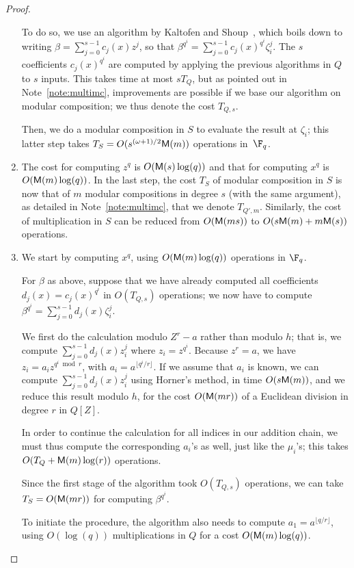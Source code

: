 \begin{proof}
\begin{enumerate}[label=\textbf{Case~\theenumi.},leftmargin=*, align=left]
  To do so, we use an algorithm by Kaltofen and Shoup~\cite{kaltofen+shoup97},
  which boils down to writing $\beta=\sum_{j=0}^{s-1} c_j(x) z^j$, so
  that $\beta^{q^i} = \sum_{j=0}^{s-1} c_j(x)^{q^i} \zeta_i^j.$ The
  $s$ coefficients $c_j(x)^{q^i}$ are computed by applying the
  previous algorithms in $Q$ to $s$ inputs. This takes time at most
  $sT_Q$, but as pointed out in Note~\ref{note:multimc}, improvements 
  are possible if we base our algorithm on modular composition;
  we thus denote the cost $T_{Q,s}$.

  Then, we do a modular composition in $S$ to evaluate the result at
  $\zeta_i$; this latter step takes $T_S=O(s^{(\omega+1)/2} \mathsf{M}(m))$
  operations in~$\F_q$.

\item
  The cost for computing $z^q$ is
  $O(\mathsf{M}(s)\log(q))$ and that for computing $x^q$ is $O(\mathsf{M}(m)\log(q))$.
  In the last step, the cost $T_S$ of modular
  composition in $S$ is now that of $m$ modular compositions in degree
  $s$ (with the same argument), as detailed in
  Note~\ref{note:multimc}, that we denote $T_{Q',m}$.
  Similarly, the cost of multiplication in $S$ can be reduced
  from $O(\mathsf{M}(ms))$ to $O(s\mathsf{M}(m) + m\mathsf{M}(s))$ operations.

\item
  We start by computing $x^q$, using $O(\mathsf{M}(m)\log(q))$ operations in
  $\F_q$.

  For $\beta$ as above, suppose that we have already computed all
  coefficients $d_j(x)=c_j(x)^{q^i}$ in $O(T_{Q,s})$ operations;
  we now have to compute $\beta^{q^i} = \sum_{j=0}^{s-1} d_j(x) \zeta_i^j$.

  We first do the calculation modulo $Z^r-a$ rather than modulo $h$;
  that is, we compute $\sum_{j=0}^{s-1} d_j(x) z_i^j$ where
  $z_i=z^{q^i}$.
  Because $z^r=a$, we
  have $z_i = a_i z^{q^i \bmod r}$, with $a_i =
  a^{\lfloor q^i/r\rfloor}$. If we assume that $a_i$ is
  known, we can compute $\sum_{j=0}^{s-1} d_j(x) z_i^j$ using
  Horner's method, in time $O(s \mathsf{M}(m))$, and we reduce this result
  modulo $h$, for the cost $O(\mathsf{M}(mr))$ of a Euclidean division in
  degree $r$ in $Q[Z]$. 

  In order to continue the calculation for all indices in our addition
  chain, we must thus compute the corresponding $a_i$'s as well,
  just like the $\mu_i$'s;
  this takes $O(T_{Q}+\mathsf{M}(m)\log(r))$ operations.

  Since the first stage of the algorithm took $O(T_{Q,s})$ operations,
  we can take $T_S = O(\mathsf{M}(mr))$
  for computing $\beta^{q^i}$.
  
  To initiate the procedure, the algorithm also needs to compute
  $a_1=a^{\lfloor q/r\rfloor}$, using $O(\log(q))$
  multiplications in $Q$ for a cost $O(\mathsf{M}(m)\log(q))$. \qedhere
\end{enumerate}
\end{proof}

